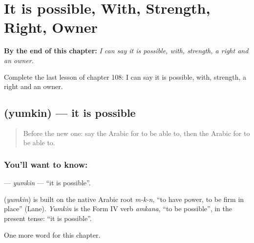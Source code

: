 
\chapter{It is possible, With, Strength, Right, Owner}
\label{ch:ar-it-is-possible-with-strength-right-owner}

\begin{chapteropening}
\textbf{By the end of this chapter:} \emph{I can say it is possible, with, strength, a right and an owner.}

Complete the last lesson of chapter 108: I can say it is possible, with, strength, a right and an owner.
\end{chapteropening}

\section[\texorpdfstring{\ar{يمكن} (yumkin)}{يمكن (yumkin)}]{ (yumkin) — it is possible}

\label{lesson:AR-C108-yumkin}



\begin{quote}
Before the new one: say the Arabic for to be able to, then the Arabic for to be able to.
\end{quote}

\subsection*{You'll want to know: }
\textbf{} — \emph{yumkin} — \textquotedblleft{}it is possible\textquotedblright{}.

\begin{cousinweb}
\textbf{} (\emph{yumkin}) is built on the native Arabic root \emph{m-k-n}, \textquotedblleft{}to have power, to be firm in place\textquotedblright{} (Lane). \emph{Yumkin} is the Form IV verb \emph{amkana}, \textquotedblleft{}to be possible\textquotedblright{}, in the present tense: \textquotedblleft{}it is possible\textquotedblright{}.
\end{cousinweb}

\begin{grammarlens}[title={What you've built}]
One more word for this chapter.
\end{grammarlens}

